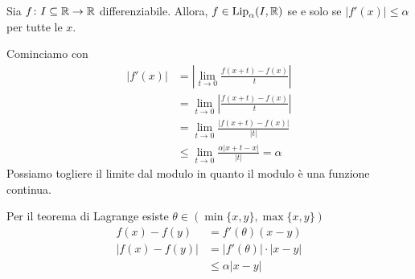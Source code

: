 \documentclass[a4paper]{article}
\begin{document}
\begin{snippetproposition}{}
    Sia \(f\colon I \subseteq \mathbb{R} \to \mathbb{R}\) differenziabile.
    Allora, \(f \in \text{Lip}_\alpha(I, \mathbb{R})\)
    se e solo se \(|f'(x)| \leq \alpha\) per tutte le \(x\).
\end{snippetproposition}

\begin{snippetproof}{}
    \begin{iffproof}
        \item Cominciamo con
        \begin{align*}
            |f'(x)| &= \left| \lim_{t\to 0} \frac{f(x+t)-f(x)}{t}\right| \\
            &= \lim_{t\to 0} \left| \frac{f(x+t)-f(x)}{t}\right| \\
            &= \lim_{t\to 0} \frac{|f(x+t)-f(x)|}{|t|} \\
            &\leq \lim_{t\to 0} \frac{\alpha |x+t-x|}{|t|} = \alpha
        \end{align*}
        Possiamo togliere il limite dal modulo in quanto il modulo è una funzione continua.
        \item Per il teorema di Lagrange esiste \(\theta \in (\min\{x,y\}, \max\{x,y\})\)
        \begin{align*}
            f(x) - f(y) &= f'(\theta) (x-y) \\
            |f(x) - f(y)| &= |f'(\theta)|\cdot |x-y| \\
            &\leq \alpha|x-y|
        \end{align*}
    \end{iffproof}
\end{snippetproof}
\end{document}

